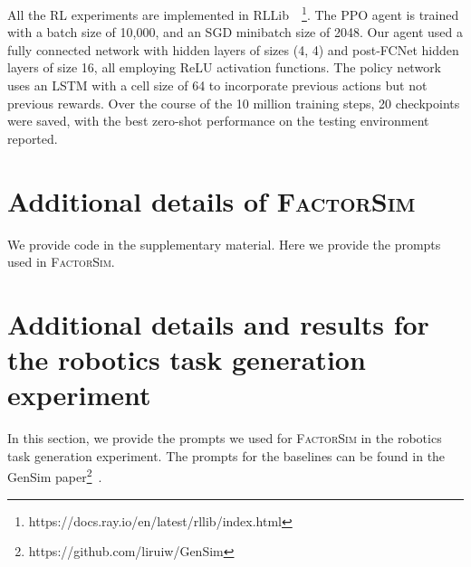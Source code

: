 \documentclass{article}
\theoremstyle{plain}
\theoremstyle{definition}
\theoremstyle{remark}
\newcommand{\method}{\textsc{FactorSim}\xspace}
\begin{document}
All the RL experiments are implemented in RLLib~\cite{liang2018rllib}~\footnote{https://docs.ray.io/en/latest/rllib/index.html}. The PPO agent is trained with a batch size of 10,000, and an SGD minibatch size of 2048. Our agent used a fully connected network with hidden layers of sizes (4, 4) and post-FCNet hidden layers of size 16, all employing ReLU activation functions. The policy network uses an LSTM with a cell size of 64 to incorporate previous actions but not previous rewards. Over the course of the 10 million training steps, 20 checkpoints were saved, with the best zero-shot performance on the testing environment reported.

\section{Additional details of \method}
We provide code in the supplementary material. Here we provide the prompts used in \method.












\section{Additional details and results for the robotics task generation experiment}
In this section, we provide the prompts we used for \method in the robotics task generation experiment. The prompts for the baselines can be found in the GenSim paper\footnote{https://github.com/liruiw/GenSim}~\cite{wang2023gensim}.
\end{document}
